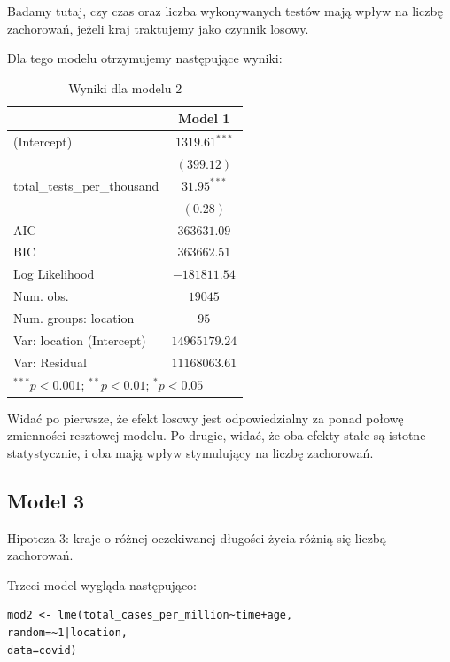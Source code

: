 \documentclass[12pt]{mwbk}
\theoremstyle{plain}
\theoremstyle{definition}
\theoremstyle{remark}
\begin{document}
Badamy tutaj, czy czas oraz liczba wykonywanych testów mają wpływ na liczbę zachorowań, jeżeli kraj traktujemy jako czynnik losowy.

Dla tego modelu otrzymujemy następujące wyniki:
\begin{table}
	\begin{center}
		\begin{tabular}{l c}
			\hline
			& Model 1 \\
			\hline
			(Intercept)                 & $1319.61^{***}$ \\
			& $(399.12)$      \\
			total\_tests\_per\_thousand & $31.95^{***}$   \\
			& $(0.28)$        \\
			\hline
			AIC                         & $363631.09$     \\
			BIC                         & $363662.51$     \\
			Log Likelihood              & $-181811.54$    \\
			Num. obs.                   & $19045$         \\
			Num. groups: location       & $95$            \\
			Var: location (Intercept)   & $14965179.24$   \\
			Var: Residual               & $11168063.61$   \\
			\hline
			\multicolumn{2}{l}{\scriptsize{$^{***}p<0.001$; $^{**}p<0.01$; $^{*}p<0.05$}}
		\end{tabular}
		\caption{Wyniki dla modelu 2}
		\label{table:model2}
	\end{center}
\end{table}

Widać po pierwsze, że efekt losowy jest odpowiedzialny za ponad połowę zmienności resztowej modelu. Po drugie, widać, że oba efekty stałe są istotne statystycznie, i oba mają wpływ stymulujący na liczbę zachorowań.

\subsection{Model 3}


Hipoteza 3: kraje o różnej oczekiwanej długości życia różnią się liczbą zachorowań.

Trzeci model wygląda następująco:

\begin{verbatim}
mod2 <- lme(total_cases_per_million~time+age,
random=~1|location,
data=covid)

\end{verbatim}
\end{document}
